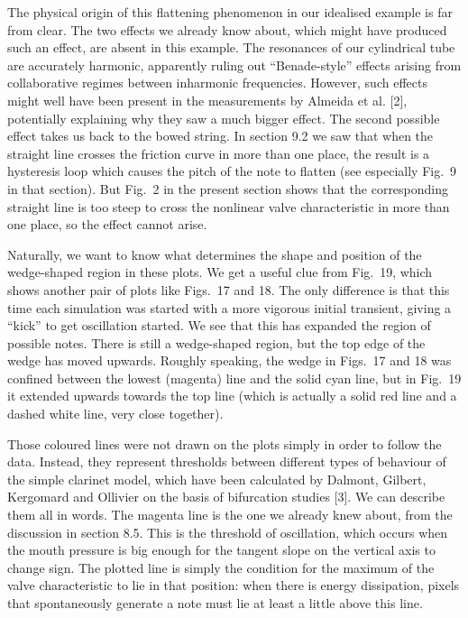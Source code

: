  The physical origin of this flattening phenomenon in our idealised example is 
  far from clear. The two effects we already know about, which might have 
  produced such an effect, are absent in this example. The resonances of our 
  cylindrical tube are accurately harmonic, apparently ruling out 
  “Benade-style” effects arising from collaborative regimes between inharmonic 
  frequencies. However, such effects might well have been present in the 
  measurements by Almeida et al. [2], potentially explaining why they saw a 
  much bigger effect. The second possible effect takes us back to the bowed 
  string. In section 9.2 we saw that when the straight line crosses the 
  friction curve in more than one place, the result is a hysteresis loop which 
  causes the pitch of the note to flatten (see especially Fig.\ 9 in that 
  section). But Fig.\ 2 in the present section shows that the corresponding 
  straight line is too steep to cross the nonlinear valve characteristic in 
  more than one place, so the effect cannot arise. 

  Naturally, we want to know what determines the shape and position of the 
  wedge-shaped region in these plots. We get a useful clue from Fig.\ 19, which 
  shows another pair of plots like Figs.\ 17 and 18. The only difference is 
  that this time each simulation was started with a more vigorous initial 
  transient, giving a “kick” to get oscillation started. We see that this has 
  expanded the region of possible notes. There is still a wedge-shaped region, 
  but the top edge of the wedge has moved upwards. Roughly speaking, the wedge 
  in Figs.\ 17 and 18 was confined between the lowest (magenta) line and the 
  solid cyan line, but in Fig.\ 19 it extended upwards towards the top line 
  (which is actually a solid red line and a dashed white line, very close 
  together). 

  Those coloured lines were not drawn on the plots simply in order to follow 
  the data. Instead, they represent thresholds between different types of 
  behaviour of the simple clarinet model, which have been calculated by 
  Dalmont, Gilbert, Kergomard and Ollivier on the basis of bifurcation studies 
  [3]. We can describe them all in words. The magenta line is the one we 
  already knew about, from the discussion in section 8.5. This is the threshold 
  of oscillation, which occurs when the mouth pressure is big enough for the 
  tangent slope on the vertical axis to change sign. The plotted line is simply 
  the condition for the maximum of the valve characteristic to lie in that 
  position: when there is energy dissipation, pixels that spontaneously 
  generate a note must lie at least a little above this line. 

